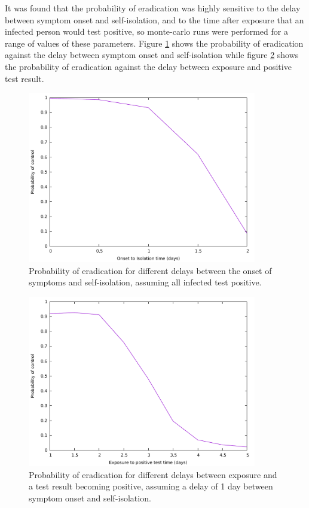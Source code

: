 \documentclass{article}
\begin{document}
It was found that the probability of eradication was highly sensitive to the delay between symptom onset and self-isolation, and to the time after exposure that an infected person would test positive, so monte-carlo runs were performed for a range of values of these parameters. Figure \ref{onsetToIsolation} shows the probability of eradication against the delay between symptom onset and self-isolation while figure \ref{exposureToPositiveTest} shows the probability of eradication against the delay between exposure and positive test result.

\begin{figure}
\begin{center}
\includegraphics[width = 10cm]{onsetToIsolation.pdf}
\end{center}
\caption{Probability of eradication for different delays between the onset of symptoms and self-isolation, assuming all infected test positive.}
\label{onsetToIsolation}
\end{figure}

\begin{figure}
\begin{center}
\includegraphics[width = 10cm]{exposureToPositiveTest.pdf}
\end{center}
\caption{Probability of eradication for different delays between exposure and a test result becoming positive, assuming a delay of 1 day between symptom onset and self-isolation.}
\label{exposureToPositiveTest}
\end{figure}
\end{document}
